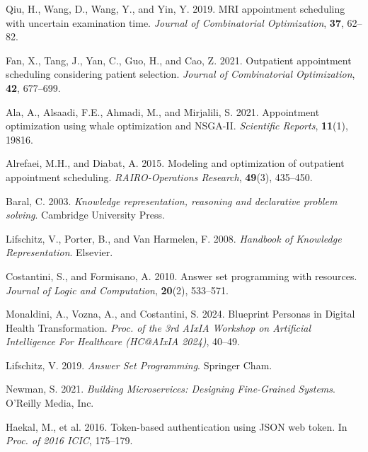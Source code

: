 \documentclass{tlp}
\begin{document}
\begin{thebibliography}{}
Qiu, H., Wang, D., Wang, Y., and Yin, Y. 2019.
MRI appointment scheduling with uncertain examination time.
\textit{Journal of Combinatorial Optimization}, \textbf{37}, 62--82.

Fan, X., Tang, J., Yan, C., Guo, H., and Cao, Z. 2021.
Outpatient appointment scheduling considering patient selection.
\textit{Journal of Combinatorial Optimization}, \textbf{42}, 677--699.

Ala, A., Alsaadi, F.E., Ahmadi, M., and Mirjalili, S. 2021.
Appointment optimization using whale optimization and NSGA-II.
\textit{Scientific Reports}, \textbf{11}(1), 19816.

Alrefaei, M.H., and Diabat, A. 2015.
Modeling and optimization of outpatient appointment scheduling.
\textit{RAIRO-Operations Research}, \textbf{49}(3), 435--450.

Baral, C. 2003.
\textit{Knowledge representation, reasoning and declarative problem solving}.
Cambridge University Press.

Lifschitz, V., Porter, B., and Van Harmelen, F. 2008.
\textit{Handbook of Knowledge Representation}.
Elsevier.

Costantini, S., and Formisano, A. 2010.
Answer set programming with resources.
\textit{Journal of Logic and Computation}, \textbf{20}(2), 533--571.

Monaldini, A., Vozna, A., and Costantini, S. 2024.
Blueprint Personas in Digital Health Transformation.
\textit{Proc. of the 3rd AIxIA Workshop on Artificial Intelligence For Healthcare (HC@AIxIA 2024)}, 40--49.

Lifschitz, V. 2019.
\textit{Answer Set Programming}.
Springer Cham.

Newman, S. 2021.
\textit{Building Microservices: Designing Fine-Grained Systems}.
O'Reilly Media, Inc.

Haekal, M., et al. 2016.
Token-based authentication using JSON web token.
In \textit{Proc. of 2016 ICIC}, 175--179.


\end{thebibliography}
\end{document}
